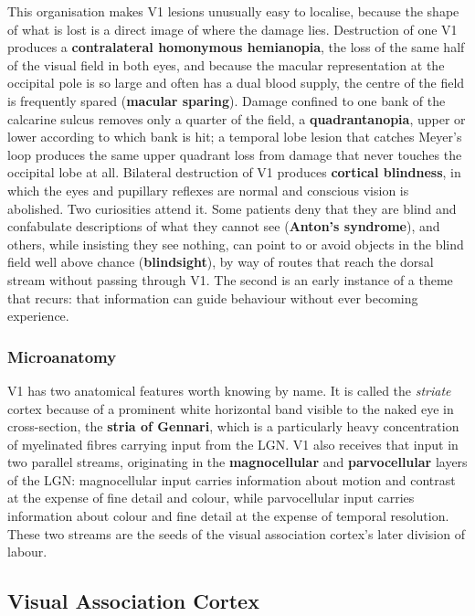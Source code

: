 \documentclass[11pt]{article}
\begin{document}
This organisation makes V1 lesions unusually easy to localise, because the shape of what is lost is a direct image of where the damage lies. Destruction of one V1 produces a \textbf{contralateral homonymous hemianopia}, the loss of the same half of the visual field in both eyes, and because the macular representation at the occipital pole is so large and often has a dual blood supply, the centre of the field is frequently spared (\textbf{macular sparing}). Damage confined to one bank of the calcarine sulcus removes only a quarter of the field, a \textbf{quadrantanopia}, upper or lower according to which bank is hit; a temporal lobe lesion that catches Meyer's loop produces the same upper quadrant loss from damage that never touches the occipital lobe at all. Bilateral destruction of V1 produces \textbf{cortical blindness}, in which the eyes and pupillary reflexes are normal and conscious vision is abolished. Two curiosities attend it. Some patients deny that they are blind and confabulate descriptions of what they cannot see (\textbf{Anton's syndrome}), and others, while insisting they see nothing, can point to or avoid objects in the blind field well above chance (\textbf{blindsight}), by way of routes that reach the dorsal stream without passing through V1. The second is an early instance of a theme that recurs: that information can guide behaviour without ever becoming experience.

\subsubsection{Microanatomy}

V1 has two anatomical features worth knowing by name. It is called the \textit{striate} cortex because of a prominent white horizontal band visible to the naked eye in cross-section, the \textbf{stria of Gennari}, which is a particularly heavy concentration of myelinated fibres carrying input from the LGN. V1 also receives that input in two parallel streams, originating in the \textbf{magnocellular} and \textbf{parvocellular} layers of the LGN: magnocellular input carries information about motion and contrast at the expense of fine detail and colour, while parvocellular input carries information about colour and fine detail at the expense of temporal resolution. These two streams are the seeds of the visual association cortex's later division of labour.

\subsection{Visual Association Cortex}
\end{document}
